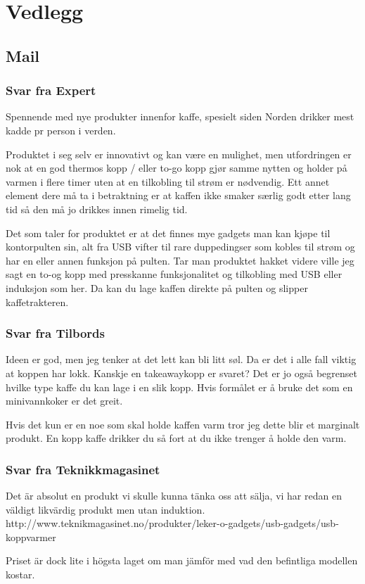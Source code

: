 \chapter{Vedlegg}

\section{Mail}

\subsection{Svar fra Expert}
Spennende med nye produkter innenfor kaffe, spesielt siden Norden drikker mest kadde pr person i verden.

Produktet i seg selv er innovativt og kan være en mulighet, men utfordringen er nok at en god thermos kopp / eller to-go kopp gjør samme nytten og holder på varmen i flere timer uten at en tilkobling til strøm er nødvendig. Ett annet element dere må ta i betraktning er at kaffen ikke smaker særlig godt etter lang tid så den må jo drikkes innen rimelig tid.

Det som taler for produktet er at det finnes mye gadgets man kan kjøpe til kontorpulten sin, alt fra USB vifter til rare duppedingser som kobles til strøm og har en eller annen funksjon på pulten.
Tar man produktet hakket videre ville jeg sagt en to-og kopp med presskanne funksjonalitet og tilkobling med USB eller induksjon som her. Da kan du lage kaffen direkte på pulten og slipper kaffetrakteren.

\subsection{Svar fra Tilbords}
Ideen er god, men jeg tenker at det lett kan bli litt søl.  Da er det i alle fall viktig at koppen har lokk.  Kanskje en takeawaykopp er svaret?  Det er jo også begrenset hvilke type kaffe du kan lage i en slik kopp.  Hvis formålet er å bruke det som en minivannkoker er det greit.

Hvis det kun er en noe som skal holde kaffen varm tror jeg dette blir et marginalt produkt.  En kopp kaffe drikker du så fort at du ikke trenger å holde den varm. 

\subsection{Svar fra Teknikkmagasinet}
Det är absolut en produkt vi skulle kunna tänka oss att sälja, vi har redan en väldigt likvärdig produkt men utan induktion.
http://www.teknikmagasinet.no/produkter/leker-o-gadgets/usb-gadgets/usb-koppvarmer

Priset är dock lite i högsta laget om man jämför med vad den befintliga modellen kostar.

